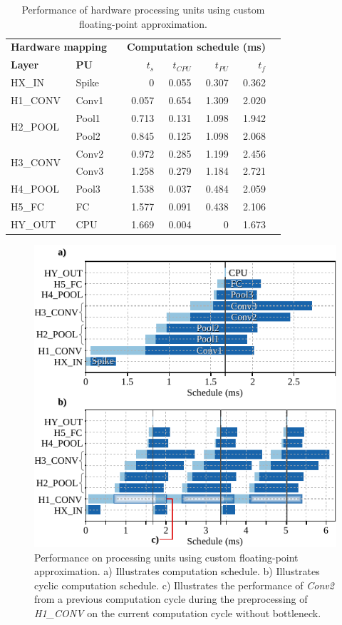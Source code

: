\begin{table}[t!]\centering
	\caption{Performance of hardware processing units using custom floating-point approximation.}\label{tab:latency_cfp}
	\scriptsize
	\begin{tabular}{llrrrrrr}\toprule
		\multicolumn{2}{c}{\textbf{Hardware mapping}} & &\multicolumn{4}{c}{\textbf{Computation schedule (ms)}} \\\cmidrule{1-2}\cmidrule{4-7}
		\textbf{Layer} &\textbf{PU} & &$t_s$ &$t_{CPU}$ &$t_{PU}$ &$t_f$ \\\midrule
		HX\_IN &Spike & &0 &0.055 &0.307 &0.362 \\
		H1\_CONV &Conv1 & &0.057 &0.654 &1.309 &2.020 \\
		\multirow{2}{*}{H2\_POOL} &Pool1 & &0.713 &0.131 &1.098 &1.942 \\
		&Pool2 & &0.845 &0.125 &1.098 &2.068 \\
		\multirow{2}{*}{H3\_CONV} &Conv2 & &0.972 &0.285 &1.199 &2.456 \\
		&Conv3 & &1.258 &0.279 &1.184 &2.721 \\
		H4\_POOL &Pool3 & &1.538 &0.037 &0.484 &2.059 \\
		H5\_FC &FC & &1.577 &0.091 &0.438 &2.106 \\
		HY\_OUT &CPU & &1.669 &0.004 &0 &1.673 \\
		\bottomrule
	\end{tabular}
\end{table}

\begin{figure}[t!]
	\centering
	\includegraphics[width=1\columnwidth]{../figures/latency_cfp_cycle.pdf}
	\caption{Performance on processing units using custom floating-point approximation. a) Illustrates computation schedule. b) Illustrates cyclic computation schedule. c) Illustrates the performance of \emph{Conv2} from a previous computation cycle during the preprocessing of \emph{H1\_CONV} on the current computation cycle without bottleneck.}
	\label{fig:latency_pu_cfp_cycle}
\end{figure}

